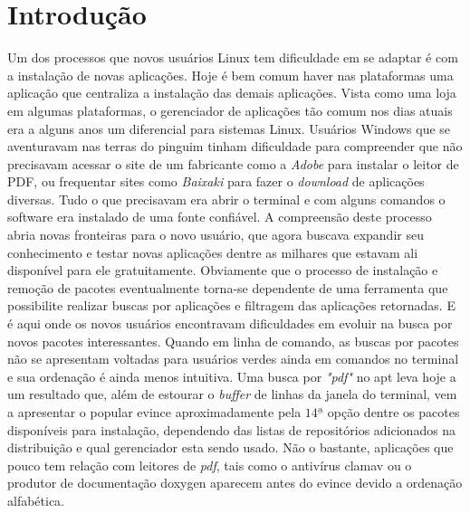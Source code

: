 \chapter{Introdução}
\label{cha:introducao}



Um dos processos  que novos usuários Linux tem dificuldade em se adaptar é com a instalação de novas aplicações. Hoje é bem comum haver nas plataformas uma aplicação que centraliza a instalação das demais aplicações. Vista como uma loja em algumas plataformas, o gerenciador de aplicações tão comum nos dias atuais era a alguns anos um diferencial para sistemas Linux. Usuários Windows que se aventuravam nas terras do pinguim  tinham dificuldade para compreender que não precisavam acessar o site de um fabricante como a \textit{Adobe} para instalar o leitor de PDF, ou frequentar sites como \textit{Baixaki} para fazer o \textit{download} de aplicações diversas. Tudo o que precisavam era abrir o terminal e com alguns comandos o software era instalado de uma fonte confiável. A compreensão deste processo abria novas fronteiras para o novo usuário, que agora buscava expandir seu conhecimento e testar novas aplicações dentre as milhares que estavam ali disponível para ele gratuitamente. Obviamente que o processo de instalação e remoção de pacotes eventualmente torna-se dependente de uma ferramenta que possibilite realizar buscas por aplicações e filtragem das aplicações retornadas. E é aqui onde os novos usuários encontravam dificuldades em evoluir na busca por novos pacotes interessantes. Quando em linha de comando, as buscas por pacotes não se apresentam voltadas para usuários verdes ainda em comandos no terminal e sua ordenação é ainda menos intuitiva. Uma busca por \textit{"pdf"} no {\code apt} leva hoje a um resultado que, além de estourar o \textit{buffer} de linhas da janela do terminal, vem a apresentar o popular {\code evince} aproximadamente pela $14ª$ opção dentre os  pacotes disponíveis para instalação, dependendo das listas de repositórios adicionados na distribuição e qual gerenciador esta sendo usado.
Não o bastante, aplicações que pouco tem relação com leitores de \textit{pdf}, tais como o antivírus {\code clamav} ou o produtor de documentação {\code doxygen} aparecem antes do {\code evince} devido a ordenação alfabética.

